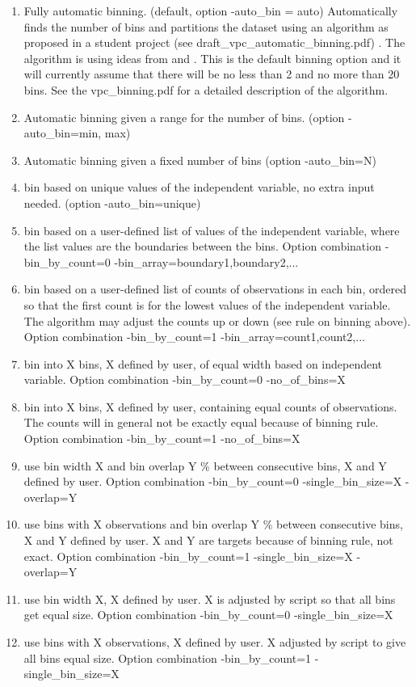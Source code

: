\begin{enumerate}
	\item Fully automatic binning. (default, option -auto\_bin = auto)
Automatically finds the number of bins and partitions the dataset using an algorithm as proposed in a student project (see draft\_vpc\_automatic\_binning.pdf) \cite{Sonehag}. The algorithm is using ideas from \cite{Calinski} and \cite{Laveille}. This is the default binning option and it will currently assume that there will be no less than 2 and no more than 20 bins. See the vpc\_binning.pdf for a detailed description of the algorithm.
	\item Automatic binning given a range for the number of bins. (option -auto\_bin=min, max)
	\item Automatic binning given a fixed number of bins (option -auto\_bin=N)
	\item bin based on unique values of the independent variable, no extra input needed. (option -auto\_bin=unique)
	\item bin based on a user-defined list of values of the independent variable, where the list values are the boundaries between the bins. Option combination -bin\_by\_count=0 -bin\_array=boundary1,boundary2,...
	\item bin based on a user-defined list of counts of observations in each bin, ordered so that the first count is for the lowest values of the independent variable. The algorithm may adjust the counts up or down (see rule on binning above). Option combination  -bin\_by\_count=1 -bin\_array=count1,count2,...
	\item bin into X bins, X defined by user, of equal width based on independent variable. Option combination -bin\_by\_count=0 -no\_of\_bins=X
	\item bin into X bins, X defined by user, containing equal counts of observations. The counts will in general not be exactly equal because of binning rule. Option combination -bin\_by\_count=1 -no\_of\_bins=X
	\item use bin width X and bin overlap Y \% between consecutive bins, X and Y defined by user. Option combination -bin\_by\_count=0 -single\_bin\_size=X -overlap=Y
	\item use bins with X observations and bin overlap Y \% between consecutive bins, X and Y defined by user.  X and Y are targets because of binning rule, not exact. Option combination -bin\_by\_count=1 -single\_bin\_size=X -overlap=Y
	\item use bin width X, X defined by user. X is adjusted by script so that all bins get equal size. Option combination -bin\_by\_count=0 -single\_bin\_size=X
	\item use bins with X observations, X defined by user.  X adjusted by script to give all bins equal size. Option combination -bin\_by\_count=1 -single\_bin\_size=X
\end{enumerate}

